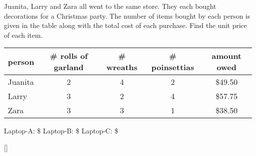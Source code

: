 \documentclass[12pt,letterpaper]{memoir}
\begin{document}
%
%
\myWideProblemWithContent
{
    Juanita, Larry and Zara all went to the same store.
    They each bought decorations for a
    Christmas party. 
    The number of items bought by each person is given in the table
    along with the total cost of each purchase. 
    Find the unit price of each item. 
    \begin{center}
        \begin{tabular}{lcccc}
            person & \# rolls of garland & \# wreaths & \# poinsettias & amount owed \\
            \toprule
            Juanita  & 2  & 4 & 2 & \$49.50  \\
            Larry    & 3  & 2 & 4 & \$57.75  \\
            Zara     & 3  & 3 & 1 & \$38.50  \\
        \end{tabular}
    \end{center}
    \mySystemTable
    \small
    Laptop-A: \$
    \hfill 
    Laptop-B: \$
    \hfill 
    Laptop-C: \$
}[\small]
\end{document}

